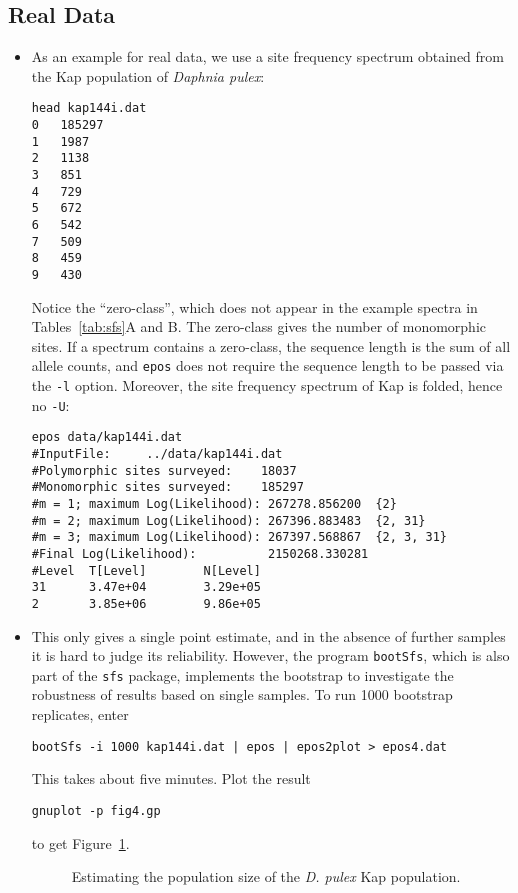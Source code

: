 \documentclass[a4paper, english]{article}
\newcommand{\ty}{\texttt}
\begin{document}
\subsection{Real Data}
\begin{itemize}
\item As an example for real data, we use a site frequency spectrum obtained from
  the Kap population of \textit{Daphnia pulex}:
\begin{verbatim}
head kap144i.dat 
0	185297
1	1987
2	1138
3	851
4	729
5	672
6	542
7	509
8	459
9	430
\end{verbatim}
Notice the ``zero-class'', which does not appear in the example
spectra in Tables~\ref{tab:sfs}A and B. The zero-class gives the
number of monomorphic sites. If a spectrum contains a zero-class, the
sequence length is the sum of all allele counts, and \ty{epos} does not
require the sequence length to be passed via the \ty{-l}
option. Moreover, the site frequency spectrum of Kap is folded, hence
no \ty{-U}:
\begin{verbatim}
epos data/kap144i.dat                                                                                       
#InputFile:     ../data/kap144i.dat
#Polymorphic sites surveyed:    18037
#Monomorphic sites surveyed:    185297
#m = 1; maximum Log(Likelihood): 267278.856200  {2}
#m = 2; maximum Log(Likelihood): 267396.883483  {2, 31}
#m = 3; maximum Log(Likelihood): 267397.568867  {2, 3, 31}
#Final Log(Likelihood):          2150268.330281
#Level  T[Level]        N[Level]
31      3.47e+04        3.29e+05
2       3.85e+06        9.86e+05                              
\end{verbatim}
\item This only gives a single point estimate, and in the absence of
  further samples it is hard to judge its reliability. However,
  the program \ty{bootSfs}, which is also part of the \ty{sfs} package, implements the bootstrap to investigate the robustness of
  results based on single samples. To run 1000 bootstrap replicates, enter
\begin{verbatim}
bootSfs -i 1000 kap144i.dat | epos | epos2plot > epos4.dat
\end{verbatim}
This takes about five minutes. Plot the result
\begin{verbatim}
gnuplot -p fig4.gp
\end{verbatim}
to get Figure~\ref{fig:kap}.
\begin{figure}
  \begin{center}
    \scalebox{0.6}{}
  \end{center}
  \caption{Estimating the population size of the \textit{D. pulex} Kap
    population.}\label{fig:kap}
\end{figure}
\end{itemize}
\end{document}

